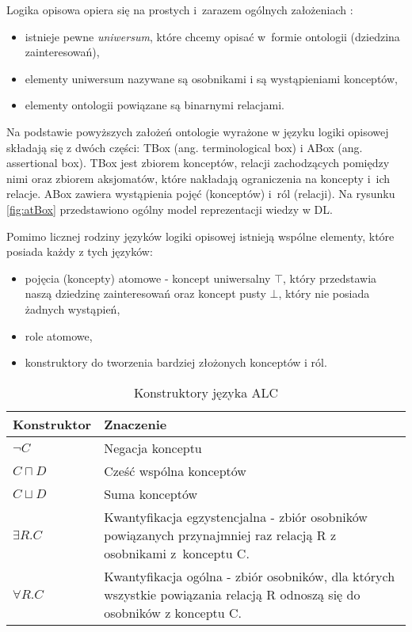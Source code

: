 Logika opisowa opiera się na prostych i~zarazem ogólnych założeniach \cite{goczyla,goczyla2}:

\begin{itemize}
 \item  istnieje pewne {\it uniwersum}, które chcemy opisać w~formie ontologii (dziedzina zainteresowań),
  \item elementy uniwersum nazywane są osobnikami i są wystąpieniami konceptów,
\item elementy ontologii powiązane są binarnymi relacjami. 
\end{itemize}


Na podstawie powyższych założeń ontologie wyrażone w języku logiki opisowej składają się z dwóch części: TBox (ang. terminological box) i ABox (ang. assertional box).
TBox jest zbiorem konceptów, relacji zachodzących pomiędzy nimi oraz zbiorem aksjomatów, które nakładają ograniczenia na koncepty i~ich relacje. ABox zawiera wystąpienia 
pojęć (konceptów) i~ról (relacji). Na rysunku \ref{fig:atBox} przedstawiono ogólny model reprezentacji wiedzy w DL. 



Pomimo licznej rodziny języków logiki opisowej istnieją wspólne elementy, które posiada każdy z tych języków:
\begin{itemize}
 \item   pojęcia (koncepty) atomowe  - koncept uniwersalny  $ \top $, który przedstawia naszą dziedzinę zainteresowań oraz koncept pusty $ \bot $, który nie 
posiada żadnych wystąpień,
\item role atomowe,
\item konstruktory do tworzenia bardziej złożonych konceptów i ról. 


\end{itemize}
\pagebreak[3]
\begin{longtable}{|m{3cm}|m{9cm}|} 
\caption{Konstruktory języka ALC \cite{goczyla,goczyla2}}
\label{t:alc} \\
\hline
\bf{Konstruktor} &  \bf{Znaczenie}  \\ \hline
$ \neg C$ & Negacja konceptu \\ \hline
$ C \sqcap D$ & Cześć wspólna konceptów \\ \hline
$ C \sqcup D $ & Suma konceptów \\ \hline
$ \exists R.C $ & Kwantyfikacja egzystencjalna  - zbiór osobników powiązanych przynajmniej raz relacją R z osobnikami z~konceptu C. \\ \hline
$\forall R.C $ &Kwantyfikacja ogólna - zbiór osobników, dla których wszystkie powiązania relacją R odnoszą się do osobników z konceptu C.  \\ \hline
\end{longtable}

